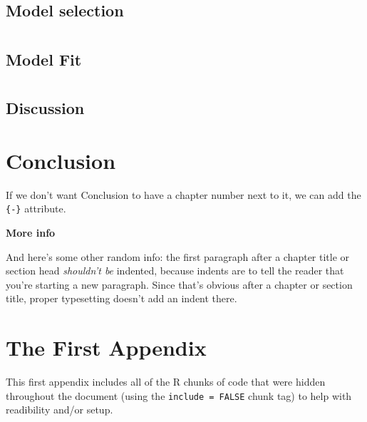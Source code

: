 \documentclass[12pt,twoside]{reedthesis}
\theoremstyle{definition}
\theoremstyle{definition}
\theoremstyle{definition}
\theoremstyle{remark}
\begin{document}
\chapter{}\label{section-3}

\section{Model selection}\label{model-selection}

\chapter{}\label{section-4}

\section{Model Fit}\label{model-fit}

\chapter{}\label{section-5}

\section{Discussion}\label{discussion}

\chapter*{Conclusion}\label{conclusion}

If we don't want Conclusion to have a chapter number next to it, we can
add the \texttt{\{-\}} attribute.

\textbf{More info}

And here's some other random info: the first paragraph after a chapter
title or section head \emph{shouldn't be} indented, because indents are
to tell the reader that you're starting a new paragraph. Since that's
obvious after a chapter or section title, proper typesetting doesn't add
an indent there.

\appendix

\chapter{The First Appendix}\label{the-first-appendix}

This first appendix includes all of the R chunks of code that were
hidden throughout the document (using the \texttt{include\ =\ FALSE}
chunk tag) to help with readibility and/or setup.
\end{document}
